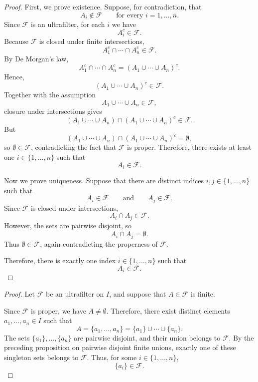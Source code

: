 {\begin{proof}
First, we prove existence. Suppose, for contradiction, that
\[
A_i \notin \mathcal{F}
\qquad \text{for every } i=1,\dots,n.
\]
Since $\mathcal{F}$ is an ultrafilter, for each $i$ we have
\[
A_i^c \in \mathcal{F}.
\]
Because $\mathcal{F}$ is closed under finite intersections,
\[
A_1^c \cap \cdots \cap A_n^c \in \mathcal{F}.
\]
By De Morgan's law,
\[
A_1^c \cap \cdots \cap A_n^c
=
\left(A_1 \cup \cdots \cup A_n\right)^c.
\]
Hence,
\[
\left(A_1 \cup \cdots \cup A_n\right)^c
\in \mathcal{F}.
\]
Together with the assumption
\[
A_1 \cup \cdots \cup A_n \in \mathcal{F},
\]
closure under intersections gives
\[
\left(A_1 \cup \cdots \cup A_n\right)
\cap
\left(A_1 \cup \cdots \cup A_n\right)^c
\in \mathcal{F}.
\]
But
\[
\left(A_1 \cup \cdots \cup A_n\right)
\cap
\left(A_1 \cup \cdots \cup A_n\right)^c
=
\emptyset,
\]
so $\emptyset \in \mathcal{F}$, contradicting the fact that
$\mathcal{F}$ is proper. Therefore, there exists at least one
$i \in \{1,\dots,n\}$ such that
\[
A_i \in \mathcal{F}.
\]

Now we prove uniqueness. Suppose that there are distinct indices
$i,j \in \{1,\dots,n\}$ such that
\[
A_i \in \mathcal{F}
\qquad \text{and} \qquad
A_j \in \mathcal{F}.
\]
Since $\mathcal{F}$ is closed under intersections,
\[
A_i \cap A_j \in \mathcal{F}.
\]
However, the sets are pairwise disjoint, so
\[
A_i \cap A_j = \emptyset.
\]
Thus $\emptyset \in \mathcal{F}$, again contradicting the
properness of $\mathcal{F}$.

Therefore, there is exactly one index
$i \in \{1,\dots,n\}$ such that
\[
A_i \in \mathcal{F}.
\]
\end{proof}

 \label{prop:finite-member-implies-principal}

\begin{proof}
Let $\mathcal{F}$ be an ultrafilter on $I$, and suppose that
$A \in \mathcal{F}$ is finite.

Since $\mathcal{F}$ is proper, we have $A \neq \emptyset$. Therefore,
there exist distinct elements $a_1,\ldots,a_n \in I$ such that
\[
A=\{a_1,\ldots,a_n\}
=
\{a_1\}\cup\cdots\cup\{a_n\}.
\]
The sets $\{a_1\},\ldots,\{a_n\}$ are pairwise disjoint, and their union
belongs to $\mathcal{F}$. By the preceding proposition on pairwise
disjoint finite unions, exactly one of these singleton sets belongs to
$\mathcal{F}$. Thus, for some $i \in \{1,\ldots,n\}$,
\[
\{a_i\}\in\mathcal{F}.
\]


\end{proof}}
